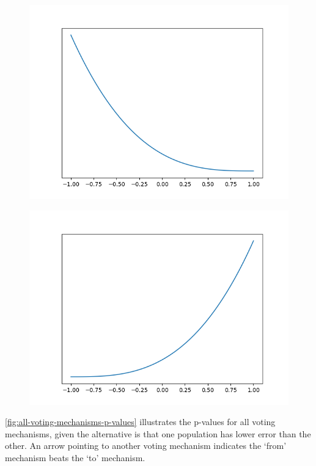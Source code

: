 \begin{figure}[!htbp]
    \centering
    \includegraphics[scale=0.5]
    {./content/figures/dists/beta_1_4}
    \caption{}
    \label{fig:beta-1-4}
\end{figure}

\begin{figure}[!htbp]
    \centering
    \includegraphics[scale=0.5]
    {./content/figures/dists/beta_4_1}
    \caption{}
    \label{fig:beta-4-1}
\end{figure}

\autoref{fig:all-voting-mechanisms-p-values} illustrates the p-values for all voting
mechanisms, given the alternative is that one population has lower error than the other.
An arrow pointing to another voting mechanism indicates the `from' mechanism beats
the `to' mechanism.

